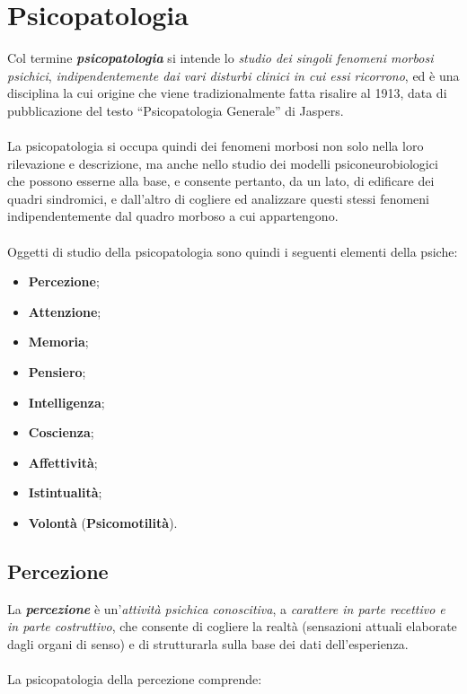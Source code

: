 \section{Psicopatologia}

Col termine \textbf{\emph{psicopatologia}} si intende lo \emph{studio dei singoli fenomeni morbosi psichici}, \emph{indipendentemente dai vari disturbi clinici in cui essi ricorrono}, ed è una disciplina la cui origine che viene tradizionalmente fatta risalire al 1913, data di
pubblicazione del testo ``Psicopatologia Generale'' di Jaspers.
\\\\
La psicopatologia si occupa quindi dei fenomeni morbosi non solo nella loro rilevazione e descrizione, ma anche nello studio dei modelli psiconeurobiologici che possono esserne alla base, e consente pertanto,
da un lato, di edificare dei quadri sindromici, e dall'altro di cogliere
ed analizzare questi stessi fenomeni indipendentemente dal quadro
morboso a cui appartengono.
\\\\
Oggetti di studio della psicopatologia sono quindi i seguenti elementi della psiche:

\begin{itemize}
\item
  \textbf{Percezione};
\item
  \textbf{Attenzione};
\item
  \textbf{Memoria};
\item
  \textbf{Pensiero};
\item
  \textbf{Intelligenza};
\item
  \textbf{Coscienza};
\item
  \textbf{Affettività};
\item
  \textbf{Istintualità};
\item
  \textbf{Volontà} (\textbf{Psicomotilità}).
\end{itemize}

\subsection{Percezione}

La \textbf{\emph{percezione}} è un'\emph{attività psichica conoscitiva},
a \emph{carattere in parte recettivo e in parte costruttivo}, che
consente di cogliere la realtà (sensazioni attuali elaborate dagli
organi di senso) e di strutturarla sulla base dei dati dell'esperienza.
\\\\
La psicopatologia della percezione comprende:

